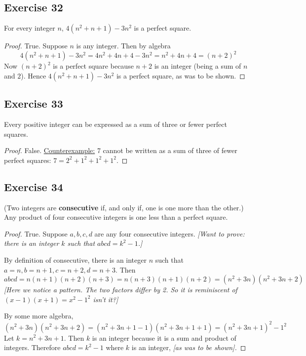 \documentclass[14pt]{extarticle}
\begin{document}
\subsection{Exercise 32}
For every integer $n$, $4(n^2 + n + 1) - 3n^2$ is a perfect square.

\begin{proof}
True. Suppose $n$ is any integer. Then by algebra
\[
4(n^2 + n + 1) - 3n^2 = 4n^2 + 4n + 4 - 3n^2 = n^2 + 4n + 4 = (n + 2)^2
\]
Now $(n + 2)^2$ is a perfect square because $n + 2$ is an integer (being a sum of $n$ and $2$). Hence $4(n^2 + n + 1) - 3n^2$ is a perfect square, as was to be shown.
\end{proof}

\subsection{Exercise 33}
Every positive integer can be expressed as a sum of three or fewer perfect squares.

\begin{proof}
False. \underline{Counterexample:} 7 cannot be written as a sum of three of fewer perfect squares: $7 = 2^2 + 1^2 + 1^2 + 1^2$.
\end{proof}

\subsection{Exercise 34}
(Two integers are {\bf consecutive} if, and only if, one is one more than the other.) Any product of four consecutive integers is one less than a perfect square.

\begin{proof}
True. Suppose $a, b, c, d$ are any four consecutive integers. {\it [Want to prove: there is an integer $k$ such that $abcd = k^2 - 1$.]}

By definition of consecutive, there is an integer $n$ such that $a = n, b = n+1, c = n+2, d = n+3$. Then
\[
abcd = n(n+1)(n+2)(n+3) = n(n+3)(n+1)(n+2) = (n^2+3n)(n^2+3n+2)
\]
{\it [Here we notice a pattern. The two factors differ by 2. So it is reminiscent of $(x-1)(x+1) = x^2 - 1^2$ isn't it?]}

By some more algebra,
\[
(n^2+3n)(n^2+3n+2) = (n^2+3n+1-1)(n^2+3n+1+1) = (n^2+3n+1)^2-1^2
\]
Let $k = n^2+3n+1$. Then $k$ is an integer because it is a sum and product of integers. Therefore $abcd = k^2 - 1$ where $k$ is an integer, {\it [as was to be shown].}
\end{proof}
\end{document}
